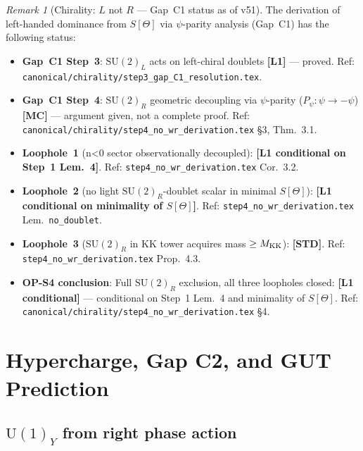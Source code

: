 \documentclass[12pt,a4paper]{article}
\theoremstyle{definition}
\theoremstyle{remark}
\newtheorem{remark}[theorem]{Remark}
\newcommand{\SU}[1]{\mathrm{SU}(#1)}
\newcommand{\UU}[1]{\mathrm{U}(#1)}
\begin{document}
\begin{remark}[Chirality: $L$ not $R$ — Gap~C1 status as of v51]
\label{rem:chirality_status}
The derivation of left-handed dominance from $S[\Theta]$ via $\psi$-parity analysis
(Gap~C1) has the following status:
\begin{itemize}
  \item \textbf{Gap~C1 Step~3}: $\SU{2}_L$ acts on left-chiral doublets
        \textbf{[L1]} — proved.
        Ref: \texttt{canonical/chirality/step3\_gap\_C1\_resolution.tex}.
  \item \textbf{Gap~C1 Step~4}: $\SU{2}_R$ geometric decoupling via
        $\psi$-parity ($P_\psi:\psi\to-\psi$) \textbf{[MC]} — argument given,
        not a complete proof.
        Ref: \texttt{canonical/chirality/step4\_no\_wr\_derivation.tex} §3, Thm.~3.1.
  \item \textbf{Loophole~1} (n\textless0 sector observationally decoupled):
        \textbf{[L1 conditional on Step~1 Lem.~4]}.
        Ref: \texttt{step4\_no\_wr\_derivation.tex} Cor.~3.2.
  \item \textbf{Loophole~2} (no light $\SU{2}_R$-doublet scalar in minimal $S[\Theta]$):
        \textbf{[L1 conditional on minimality of $S[\Theta]$]}.
        Ref: \texttt{step4\_no\_wr\_derivation.tex} Lem.~\texttt{no\_doublet}.
  \item \textbf{Loophole~3} ($\SU{2}_R$ in KK tower acquires mass $\geq M_{\rm KK}$):
        \textbf{[STD]}.
        Ref: \texttt{step4\_no\_wr\_derivation.tex} Prop.~4.3.
  \item \textbf{OP-S4 conclusion}: Full $\SU{2}_R$ exclusion, all three loopholes closed:
        \textbf{[L1 conditional]} — conditional on Step~1 Lem.~4 and minimality of
        $S[\Theta]$.
        Ref: \texttt{canonical/chirality/step4\_no\_wr\_derivation.tex} §4.
\end{itemize}
\end{remark}

\section{Hypercharge, Gap C2, and GUT Prediction}
\label{sec:u1}
\label{sec:hypercharge}

\subsection{$\UU{1}_Y$ from right phase action}
\end{document}
